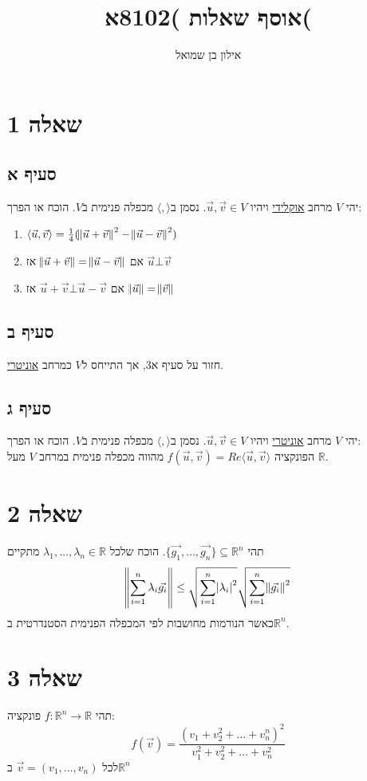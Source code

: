 \documentclass[11pt, oneside]{article}
\title{אוסף שאלות )8102א(}
\author{אילון בן שמואל}
\date{}
\newcommand{\mR}{\mathbb{R}}
\newcommand{\ip}[2]{\langle #1, #2 \rangle}
\begin{document}
\maketitle

\section{שאלה 1}
\subsection{סעיף א}
יהי $V$ מרחב \underline{אוקלידי} ויהיו $\vec{u}, \vec{v} \in V$. נסמן ב$\ip{}{}$ מכפלה פנימית ב$V$. הוכח או הפרך:
\begin{enumerate}
\item $\ip{\vec{u}}{\vec{v}} = \frac{1}{4}(\norm{\vec{u} + \vec{v}}^2 - \norm{\vec{u} - \vec{v}}^2)$
\item אם $\norm{\vec{u} + \vec{v}} = \norm{\vec{u} - \vec{v}}$ אז $\vec{u} \bot \vec{v}$
\item אם $\vec{u} + \vec{v} \bot \vec{u} - \vec{v}$ אז $\norm{\vec{u}} = \norm{\vec{v}}$
\end{enumerate}

\subsection{סעיף ב}
חזור על סעיף א3, אך התייחס ל$V$ כמרחב \underline{אוניטרי}.

\subsection{סעיף ג}
יהי $V$ מרחב \underline{אוניטרי} ויהיו $\vec{u}, \vec{v} \in V$. נסמן ב$\ip{}{}$ מכפלה פנימית ב$V$. הוכח או הפרך:\\
הפונקציה $f(\vec{u}, \vec{v}) = Re \ip{\vec{u}}{\vec{v}}$ מהווה מכפלה פנימית במרחב $V$ מעל $\mR$.

\section{שאלה 2}
תהי $\{\vec{g_1}, \dots, \vec{g_n}\} \subseteq \mR^n$. הוכח שלכל $\lambda_1, \dots, \lambda_n \in \mR$ מתקיים
\[
\norm{\sum^{n}_{i = 1} \lambda_i \vec{g_i}} \le
\sqrt{\sum^{n}_{i = 1} \abs{\lambda_i}^2}
\sqrt{\sum^{n}_{i = 1} \norm{\vec{g_i}}^2}
\]
כאשר הנורמות מחושבות לפי המכפלה הפנימית הסטנדרטית ב$\mR^n$.
\clearpage

\section{שאלה 3}
תהי $f: \mR^n \to \mR$ פונקציה:
\[
f(\vec{v}) = \frac{(v_1 + v^2_2 + \dots + v^n_n)^2}{v^2_1 + v^2_2 + \dots + v^2_n}
\]
לכל $\vec{v} = (v_1, \dots, v_n)$ ב$\mR^n$
\end{document}
